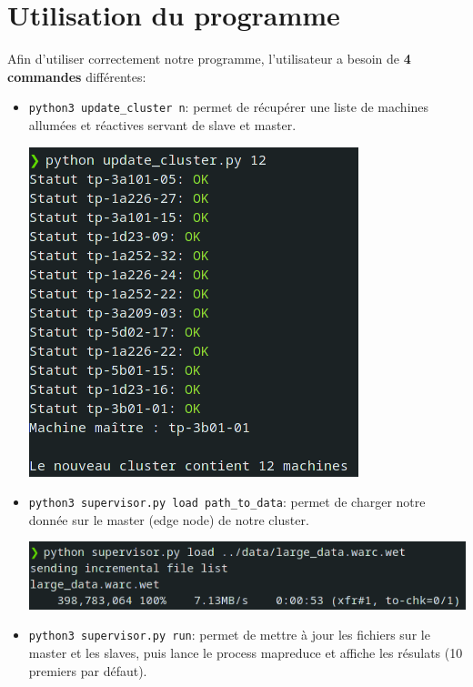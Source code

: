 \documentclass{article}
\begin{document}
\section{Utilisation du programme}
Afin d'utiliser correctement notre programme, l'utilisateur a besoin de \textbf{4 commandes} différentes:
\begin{itemize}
    \item \texttt{python3 update\_cluster n}: permet de récupérer une liste de machines allumées et réactives servant de slave et master.
    \begin{center}
        \includegraphics[scale=0.5]{img/update.png}
    \end{center}    
    \item \texttt{python3 supervisor.py load path\_to\_data}: permet de charger notre donnée sur le master (edge node) de notre cluster.
    \begin{center}
        \includegraphics[scale=0.5]{img/load.png}
    \end{center}    
    \item \texttt{python3 supervisor.py run}: permet de mettre à jour les fichiers sur le master et les slaves, puis lance le process mapreduce et affiche les résulats (10 premiers par défaut).
    \begin{center}

\end{center}
\end{itemize}
\end{document}
